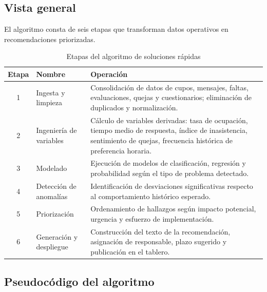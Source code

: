 \subsection{Vista general}
El algoritmo consta de seis etapas que transforman datos operativos en
recomendaciones priorizadas.

\begin{table}[H]
\centering
\caption{Etapas del algoritmo de soluciones rápidas}
\label{tab:etapas-algoritmo}
\small
\begin{tabularx}{\textwidth}{@{}c l X@{}}
\toprule
\rowcolor{moradoClaro}
\textbf{Etapa} & \textbf{Nombre} & \textbf{Operación} \\
\midrule
1 & Ingesta y limpieza &
    Consolidación de datos de cupos, mensajes, faltas, evaluaciones, quejas y
    cuestionarios; eliminación de duplicados y normalización. \\
2 & Ingeniería de variables &
    Cálculo de variables derivadas: tasa de ocupación, tiempo medio de
    respuesta, índice de inasistencia, sentimiento de quejas, frecuencia
    histórica de preferencia horaria. \\
3 & Modelado &
    Ejecución de modelos de clasificación, regresión y probabilidad según el
    tipo de problema detectado. \\
4 & Detección de anomalías &
    Identificación de desviaciones significativas respecto al comportamiento
    histórico esperado. \\
5 & Priorización &
    Ordenamiento de hallazgos según impacto potencial, urgencia y esfuerzo de
    implementación. \\
6 & Generación y despliegue &
    Construcción del texto de la recomendación, asignación de responsable,
    plazo sugerido y publicación en el tablero. \\
\bottomrule
\end{tabularx}
\end{table}

\subsection{Pseudocódigo del algoritmo}

